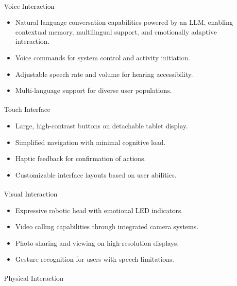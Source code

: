 \documentclass[
  letterpaper,
  DIV=11,
  numbers=noendperiod]{scrartcl}
\makeatletter
\let\oldparagraph\paragraph
\renewcommand{\paragraph}{
    \@ifstar
      \xxxParagraphStar
      \xxxParagraphNoStar
  }
\newcommand{\xxxParagraphStar}[1]{\oldparagraph*{#1}\mbox{}}
\newcommand{\xxxParagraphNoStar}[1]{\oldparagraph{#1}\mbox{}}
\providecommand{\tightlist}{%
  \setlength{\itemsep}{0pt}\setlength{\parskip}{0pt}}\usepackage{longtable,booktabs,array}
\makeatother
\begin{document}
\paragraph{Voice Interaction}\label{voice-interaction}

\begin{itemize}
\tightlist
\item
  Natural language conversation capabilities powered by an LLM, enabling
  contextual memory, multilingual support, and emotionally adaptive
  interaction.
\item
  Voice commands for system control and activity initiation.
\item
  Adjustable speech rate and volume for hearing accessibility.
\item
  Multi-language support for diverse user populations.
\end{itemize}

\paragraph{Touch Interface}\label{touch-interface}

\begin{itemize}
\tightlist
\item
  Large, high-contrast buttons on detachable tablet display.
\item
  Simplified navigation with minimal cognitive load.
\item
  Haptic feedback for confirmation of actions.
\item
  Customizable interface layouts based on user abilities.
\end{itemize}

\paragraph{Visual Interaction}\label{visual-interaction}

\begin{itemize}
\tightlist
\item
  Expressive robotic head with emotional LED indicators.
\item
  Video calling capabilities through integrated camera systems.
\item
  Photo sharing and viewing on high-resolution displays.
\item
  Gesture recognition for users with speech limitations.
\end{itemize}

\paragraph{Physical Interaction}\label{physical-interaction}
\end{document}

